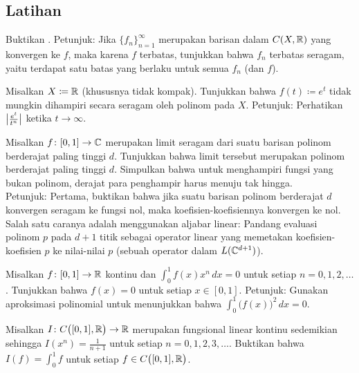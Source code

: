 \subsection{Latihan}

\begin{exercise}
Buktikan .
Petunjuk: Jika $\{ f_n \}_{n=1}^\infty$ merupakan barisan dalam $C(X,{\mathbb{R}})$
yang konvergen ke $f$, maka karena $f$ terbatas, tunjukkan bahwa $f_n$
terbatas seragam, yaitu terdapat satu batas yang berlaku untuk semua $f_n$
(dan $f$).
\end{exercise}

\begin{exercise}
Misalkan $X \coloneqq {\mathbb{R}}$ (khususnya tidak kompak).
Tunjukkan bahwa $f(t) \coloneqq e^t$ tidak mungkin dihampiri secara seragam
oleh polinom pada $X$. Petunjuk: Perhatikan $\bigl\lvert {\frac{e^t}{t^n}} \bigr\rvert$
ketika $t \to \infty$.
\end{exercise}

\begin{exercise}
Misalkan $f \colon [0,1] \to {\mathbb{C}}$ merupakan limit seragam dari suatu barisan
polinom berderajat paling tinggi $d$. Tunjukkan bahwa limit tersebut merupakan
polinom berderajat paling tinggi $d$. Simpulkan bahwa untuk menghampiri fungsi
yang bukan polinom, derajat para penghampir harus menuju tak hingga.\\
Petunjuk: Pertama, buktikan bahwa jika suatu barisan polinom berderajat $d$
konvergen seragam ke fungsi nol, maka koefisien-koefisiennya konvergen ke nol.
Salah satu caranya adalah menggunakan aljabar linear: Pandang evaluasi polinom $p$
pada $d+1$ titik sebagai operator linear yang memetakan koefisien-koefisien
$p$ ke nilai-nilai $p$ (sebuah operator dalam $L({\mathbb{C}}^{d+1})$).
\end{exercise}

\begin{exercise}
Misalkan $f \colon [0,1] \to {\mathbb{R}}$ kontinu dan
$\int_0^1 f(x) x^n \, dx = 0$ untuk setiap $n = 0,1,2,\ldots$.
Tunjukkan bahwa $f(x) = 0$ untuk setiap $x \in [0,1]$.
Petunjuk: Gunakan aproksimasi polinomial untuk menunjukkan bahwa
$\int_0^1 {\bigl( f(x) \bigr)}^2 \, dx = 0$.
\end{exercise}

\begin{exercise}
Misalkan $I \colon C\bigl([0,1],{\mathbb{R}}\bigr) \to {\mathbb{R}}$ merupakan
fungsional linear kontinu sedemikian sehingga
$I(x^n) = \frac{1}{n+1}$
untuk setiap $n=0,1,2,3,\ldots$.
Buktikan bahwa $I(f) = \int_0^1 f$ untuk setiap
$f \in C\bigl([0,1],{\mathbb{R}}\bigr)$.
\end{exercise}

